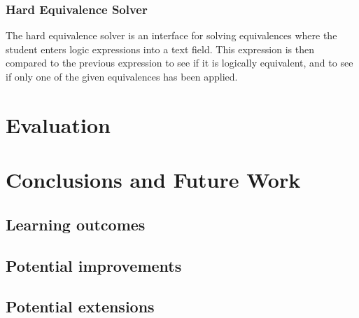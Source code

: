 \documentclass{report}
\begin{document}
\subsection{Hard Equivalence Solver}

The hard equivalence solver is an interface for solving equivalences where
the student enters logic expressions into a text field. This expression is
then compared to the previous expression to see if it is logically equivalent,
and to see if only one of the given equivalences has been applied. 





\chapter{Evaluation}


\chapter{Conclusions and Future Work}
\section{Learning outcomes}
\section{Potential improvements}
\section{Potential extensions}


\begin{thebibliography}{9}
\end{thebibliography}
\end{document}

